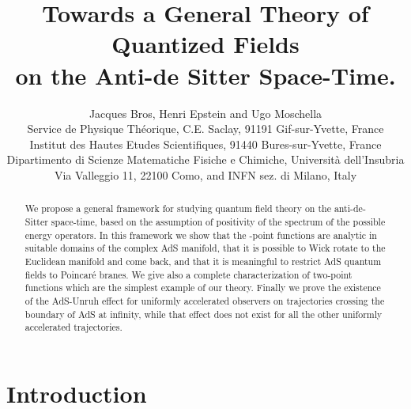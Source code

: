 \documentclass[a4paper,a4paper]{article}
\title{\bf Towards a General
Theory of Quantized Fields \\ on the Anti-de Sitter Space-Time.}
\author{{Jacques Bros\myHighlight{$^{1}$}\coordHE{}, Henri Epstein\myHighlight{$^{2}$}\coordHE{} and Ugo Moschella\myHighlight{$^{3}$}\coordHE{}  }\\[20pt]
 {\small \myHighlight{$^{1}$}\coordHE{}Service de Physique Th\'eorique, C.E. Saclay,
{91191 Gif-sur-Yvette, France}}\\
{\small \myHighlight{$^{2}$}\coordHE{}Institut des Hautes Etudes Scientifiques,
91440 Bures-sur-Yvette,
France}\\
{\small \myHighlight{$^{3}$}\coordHE{}Dipartimento di Scienze Matematiche Fisiche e Chimiche, Universit\`a dell'Insubria}\\
{\small Via Valleggio 11, 22100 Como,
and INFN sez. di Milano, Italy}}
\date{\dateline}
\let\UnmodifSec=\section
\renewcommand{\section}{\setcounter{equation}{0}\UnmodifSec}
\begin{document}
\maketitle




\begin{abstract}
We propose a general framework for studying quantum field theory
on the anti-de-Sitter space-time, based on the assumption of
positivity of the spectrum of the possible energy operators. In
this framework we show that the \coordHE{}-point functions are analytic
in suitable domains of the complex AdS manifold, that it is
possible to Wick rotate to the Euclidean manifold and come back,
and that it is meaningful to restrict AdS quantum fields to
Poincar\'e branes. We give also a complete characterization of
two-point functions which are the simplest example of our theory.
Finally we prove the existence of the AdS-Unruh effect
for uniformly accelerated observers on trajectories
crossing the boundary of AdS at infinity, while
that effect does not exist for all the other
uniformly accelerated trajectories.


\end{abstract}


\section{Introduction}
\end{document}
